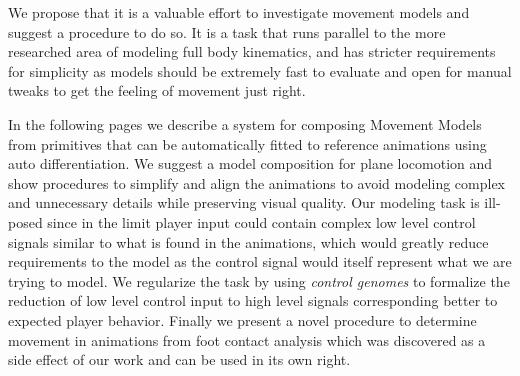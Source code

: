 We propose that it is a valuable effort to investigate movement models and suggest a procedure to do so. It is a task that runs parallel to the more researched area of modeling full body kinematics, and has stricter requirements for simplicity as models should be extremely fast to evaluate and open for manual tweaks to get the feeling of movement just right. 

In the following pages we describe a system for composing Movement Models from primitives that can be automatically fitted to reference animations using auto differentiation. We suggest a model composition for plane locomotion and show procedures to simplify and align the animations to avoid modeling complex and unnecessary details while preserving visual quality. Our modeling task is ill-posed since in the limit player input could contain complex low level control signals similar to what is found in the animations, which would greatly reduce requirements to the model as the control signal would itself represent what we are trying to model. We regularize the task by using \textit{control genomes} to formalize the reduction of low level control input to high level signals corresponding better to expected player behavior. Finally we present a novel procedure to determine movement in animations from foot contact analysis which was discovered as a side effect of our work and can be used in its own right.










